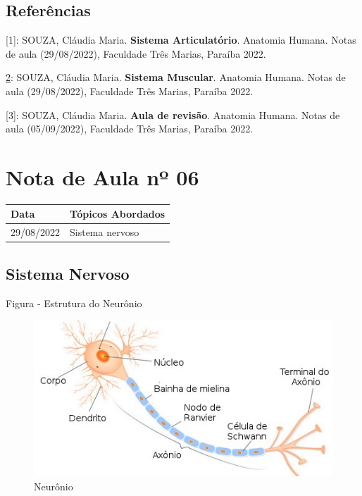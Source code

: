 \documentclass[
]{book}
\begin{document}
\hypertarget{referuxeancias-3}{%
\subsection{Referências}\label{referuxeancias-3}}

{[}1{]}: SOUZA, Cláudia Maria. \textbf{Sistema Articulatório}. Anatomia Humana. Notas de aula (29/08/2022), Faculdade Três Marias, Paraíba 2022.

\href{MARIEB,\%20Elaine\%20N.;\%20WILHELM,\%20Patricia\%20Brady;\%20MALLAT,\%20Jon.\%20**Anatomia\%20Humana**.\%207.ed.\%20São\%20Paulo:Pearson,\%202014.}{2}: SOUZA, Cláudia Maria. \textbf{Sistema Muscular}. Anatomia Humana. Notas de aula (29/08/2022), Faculdade Três Marias, Paraíba 2022.

{[}3{]}: SOUZA, Cláudia Maria. \textbf{Aula de revisão}. Anatomia Humana. Notas de aula (05/09/2022), Faculdade Três Marias, Paraíba 2022.

\hypertarget{nota-de-aula-nuxba-06}{%
\section{Nota de Aula nº 06}\label{nota-de-aula-nuxba-06}}

\begin{longtable}[]{@{}ll@{}}
\toprule()
Data & Tópicos Abordados \\
\midrule()
\endhead
29/08/2022 & Sistema nervoso \\
\bottomrule()
\end{longtable}

\hypertarget{sistema-nervoso}{%
\subsection{Sistema Nervoso}\label{sistema-nervoso}}

Figura - Estrutura do Neurônio

\begin{figure}

{\centering \includegraphics[width=0.9\linewidth]{figuras/Aula6-1-neuronio} 

}

\caption{Neurônio}\label{fig:unnamed-chunk-12}
\end{figure}
\end{document}

